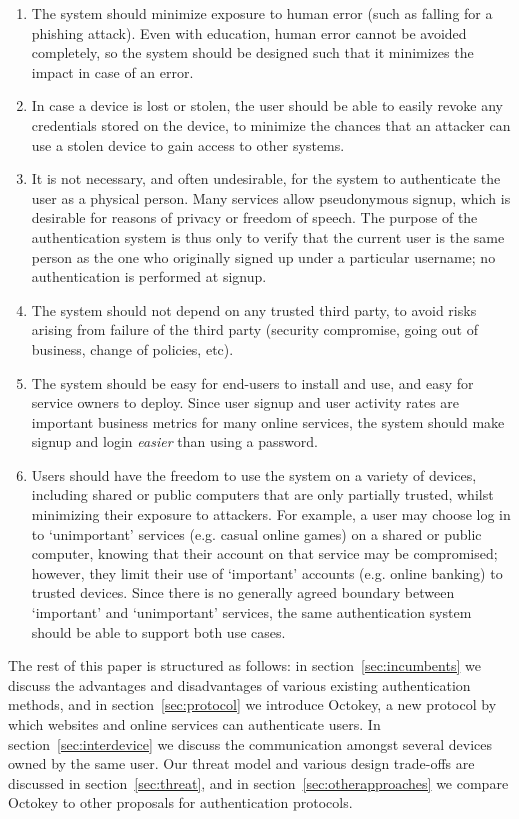 \begin{enumerate}
\item The system should minimize exposure to human error (such as falling for a phishing attack).
Even with education, human error cannot be avoided completely, so the system should be designed such
that it minimizes the impact in case of an error.
\item In case a device is lost or stolen, the user should be able to easily revoke any credentials
stored on the device, to minimize the chances that an attacker can use a stolen device to gain
access to other systems.
\item It is not necessary, and often undesirable, for the system to authenticate the user as a
physical person. Many services allow pseudonymous signup, which is desirable for reasons of privacy
or freedom of speech. The purpose of the authentication system is thus only to verify that the
current user is the same person as the one who originally signed up under a particular username; no
authentication is performed at signup.
\item The system should not depend on any trusted third party, to avoid risks arising from failure
of the third party (security compromise, going out of business, change of policies, etc).
\item The system should be easy for end-users to install and use, and easy for service owners to
deploy. Since user signup and user activity rates are important business metrics for many online
services, the system should make signup and login \emph{easier} than using a password.
\item Users should have the freedom to use the system on a variety of devices, including shared or
public computers that are only partially trusted, whilst minimizing their exposure to attackers.
For example, a user may choose log in to `unimportant' services (e.g. casual online games) on a
shared or public computer, knowing that their account on that service may be compromised; however,
they limit their use of `important' accounts (e.g. online banking) to trusted devices. Since there
is no generally agreed boundary between `important' and `unimportant' services, the same
authentication system should be able to support both use cases.
\end{enumerate}

The rest of this paper is structured as follows: in section~\ref{sec:incumbents} we discuss the
advantages and disadvantages of various existing authentication methods, and in
section~\ref{sec:protocol} we introduce Octokey, a new protocol by which websites and online
services can authenticate users. In section~\ref{sec:interdevice} we discuss the communication
amongst several devices owned by the same user. Our threat model and various design trade-offs are
discussed in section~\ref{sec:threat}, and in section~\ref{sec:otherapproaches} we compare Octokey
to other proposals for authentication protocols.

